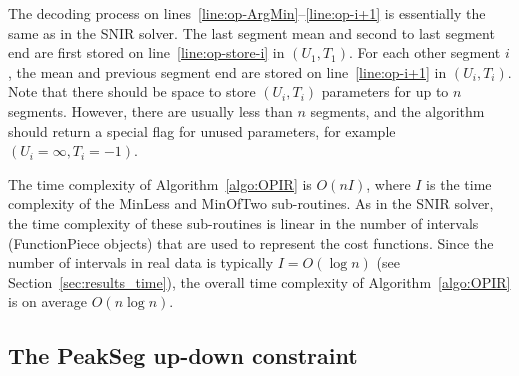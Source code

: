 \documentclass{article}
\begin{document}
The decoding process on lines~\ref{line:op-ArgMin}--\ref{line:op-i+1}
is essentially the same as in the SNIR solver. The last segment mean
and second to last segment end are first stored on
line~\ref{line:op-store-i} in $(U_1,T_1)$. For each other segment $i$,
the mean and previous segment end are stored on line~\ref{line:op-i+1}
in $(U_i,T_i)$. Note that there should be space to store $(U_i,T_i)$
parameters for up to $n$ segments. However, there are usually less
than $n$ segments, and the algorithm should return a special flag for
unused parameters, for example $(U_i=\infty, T_i=-1)$.

The time complexity of Algorithm~\ref{algo:OPIR} is $O(n I)$, where
$I$ is the time complexity of the MinLess and MinOfTwo
sub-routines. As in the SNIR solver, the time complexity of these
sub-routines is linear in the number of intervals (FunctionPiece
objects) that are used to represent the cost functions. Since the
number of intervals in real data is typically $I=O(\log n)$ (see
Section~\ref{sec:results_time}), the overall time complexity of
Algorithm~\ref{algo:OPIR} is on average $O(n \log n)$.


\subsection{The PeakSeg up-down constraint}
\label{sec:PeakSeg}
\end{document}
